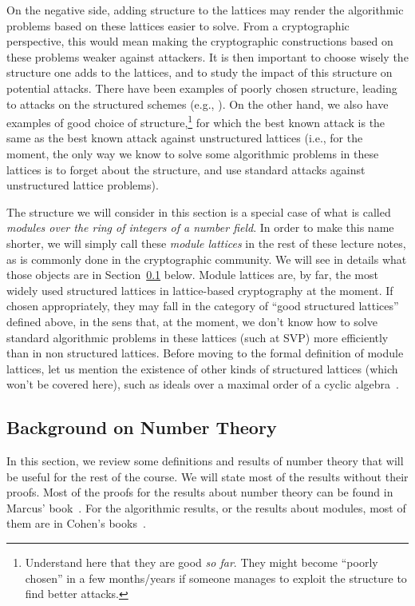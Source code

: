 On the negative side, adding structure to the lattices may render the algorithmic problems based on these lattices easier to solve. From a cryptographic perspective, this would mean making the cryptographic constructions based on these problems weaker against attackers. It is then important to choose wisely the structure one adds to the lattices, and to study the impact of this structure on potential attacks.
There have been examples of poorly chosen structure, leading to attacks on the structured schemes  (e.g., \cite{Gentry01, BCV20}).
On the other hand, we also have examples of good choice of structure,\footnote{Understand here that they are good \emph{so far}. They might become ``poorly chosen'' in a few months/years if someone manages to exploit the structure to find better attacks.} for which the best known attack is the same as the best known attack against unstructured lattices (i.e., for the moment, the only way we know to solve some algorithmic problems in these lattices is to forget about the structure, and use standard attacks against unstructured lattice problems).

The structure we will consider in this section is a special case of what is called \emph{modules over the ring of integers of a number field}. In order to make this name shorter, we will simply call these \emph{module lattices} in the rest of these lecture notes, as is commonly done in the cryptographic community. We will see in details what those objects are in Section~\ref{sec:number-theory} below. Module lattices are, by far, the most widely used structured lattices in lattice-based cryptography at the moment. If chosen appropriately, they may fall in the category of ``good structured lattices'' defined above, in the sens that, at the moment, we don't know how to solve standard algorithmic problems in these lattices (such at SVP) more efficiently than in non structured lattices.
Before moving to the formal definition of module lattices, let us mention the existence of other kinds of structured lattices (which won't be covered here), such as ideals over a maximal order of a cyclic algebra~\cite{CLWE}.


\subsection{Background on Number Theory}
\label{sec:number-theory}
In this section, we review some definitions and results of number theory that will be useful for the rest of the course. We will state most of the results without their proofs. Most of the proofs for the results about number theory can be found in Marcus' book~\cite{Marcus}. For the algorithmic results, or the results about modules, most of them are in Cohen's books~\cite{Cohen1, Cohen2}.
